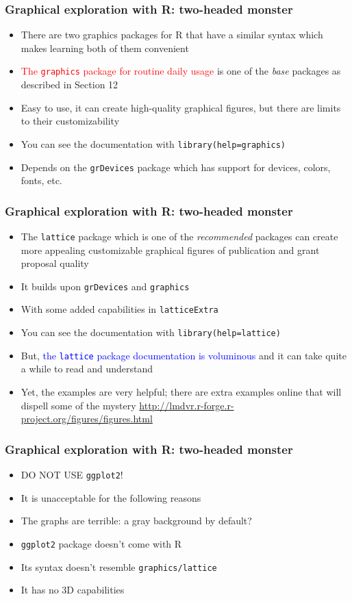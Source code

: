 \documentclass[11pt,pdftex,dvipsnames,usenames,helvetica]{beamer}
\begin{document}
\begin{frame}[fragile]
\frametitle{Graphical exploration with R: two-headed monster}

\begin{itemize}
\item There are two graphics packages for R that have 
a similar syntax which makes learning both of them convenient
\item \textcolor{red}{The {\tt graphics} package for routine daily usage}
is one of the {\it base} packages as described in Section 12
\item Easy to use, it can create high-quality
graphical figures, but there are limits to their customizability
\item You can see the documentation with {\tt library(help=graphics)}
\item Depends on the {\tt grDevices} package which has support for
devices, colors, fonts, etc.
\end{itemize}

\end{frame}

\begin{frame}[fragile]
\frametitle{Graphical exploration with R: two-headed monster}

\begin{itemize}
\item The {\tt lattice} package which is one of the {\it recommended}
packages can create more appealing customizable graphical figures of
publication and grant proposal quality
\item It builds upon {\tt grDevices} and {\tt graphics}
\item With some added capabilities in {\tt latticeExtra}
\item You can see the documentation with {\tt library(help=lattice)}
\item But, \textcolor{blue}{the {\tt lattice} package documentation is 
voluminous} and it can take quite a while to read and understand
\item Yet, the examples are very helpful; there are extra examples
online that will dispell some of the mystery  
\url{http://lmdvr.r-forge.r-project.org/figures/figures.html}
\end{itemize}
\end{frame}

\begin{frame}[fragile]
\frametitle{Graphical exploration with R: two-headed monster}
\begin{itemize}
\item DO NOT USE {\tt ggplot2}!  
\item It is unacceptable for the following reasons
\item The graphs are terrible: a gray background by default?
\item {\tt ggplot2} package doesn't come with R
\item Its syntax doesn't resemble {\tt graphics/lattice}
\item It has no 3D capabilities
\end{itemize}

\end{frame}
\end{document}
